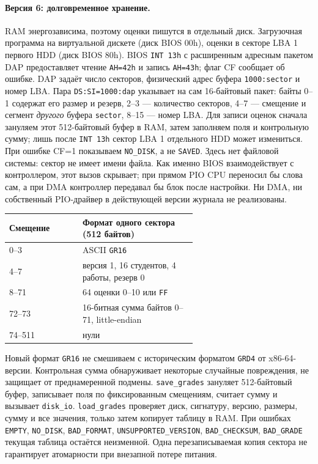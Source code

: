 \paragraph{Версия 6: долговременное хранение.}
RAM энергозависима, поэтому оценки пишутся в отдельный диск.
Загрузочная программа на виртуальной дискете (диск BIOS 00h), оценки
в секторе LBA 1 первого HDD (диск BIOS 80h). BIOS \texttt{INT 13h}
с расширенным адресным пакетом DAP предоставляет чтение \texttt{AH=42h}
и запись \texttt{AH=43h}; флаг CF сообщает об ошибке. DAP задаёт
число секторов, физический адрес буфера \texttt{1000:sector} и номер LBA.
Пара \texttt{DS:SI=1000:dap} указывает на сам 16-байтовый пакет:
байты 0--1 содержат его размер и резерв, 2--3 --- количество секторов,
4--7 --- смещение и сегмент \emph{другого} буфера \texttt{sector},
8--15 --- номер LBA. Для записи оценок сначала зануляем этот 512-байтовый
буфер в RAM, затем заполняем поля и контрольную сумму; лишь после
\texttt{INT 13h} сектор LBA 1 отдельного HDD может измениться. При
ошибке CF=1 показываем \texttt{NO\_DISK}, а не \texttt{SAVED}.
Здесь нет файловой системы: сектор не имеет имени файла. Как именно
BIOS взаимодействует с контроллером, этот вызов скрывает; при прямом
PIO CPU переносил бы слова сам, а при DMA контроллер передавал бы блок
после настройки. Ни DMA, ни собственный PIO-драйвер в действующей версии
журнала не реализованы.

\begin{center}\small
\begin{tabular}{|l|p{0.61\linewidth}|}\hline
Смещение & Формат одного сектора (512 байтов) \\ \hline
0--3 & ASCII \texttt{GR16} \\
4--7 & версия 1, 16 студентов, 4 работы, резерв 0 \\
8--71 & 64 оценки 0--10 или \texttt{FF} \\
72--73 & 16-битная сумма байтов 0--71, little-endian \\
74--511 & нули \\ \hline
\end{tabular}\end{center}
Новый формат \texttt{GR16} не смешиваем с историческим форматом
\texttt{GRD4} от x86-64-версии. Контрольная сумма обнаруживает некоторые
случайные повреждения, не защищает от преднамеренной подмены.
\texttt{save\_grades} зануляет 512-байтовый буфер, записывает поля по
фиксированным смещениям, считает сумму и вызывает \texttt{disk\_io}.
\texttt{load\_grades} проверяет диск, сигнатуру, версию, размеры,
сумму и все значения, только затем копирует таблицу в RAM. При ошибках
\texttt{EMPTY}, \texttt{NO\_DISK}, \texttt{BAD\_FORMAT},
\texttt{UNSUPPORTED\_VERSION}, \texttt{BAD\_CHECKSUM}, \texttt{BAD\_GRADE}
текущая таблица остаётся неизменной. Одна перезаписываемая копия сектора
не гарантирует атомарности при внезапной потере питания.

